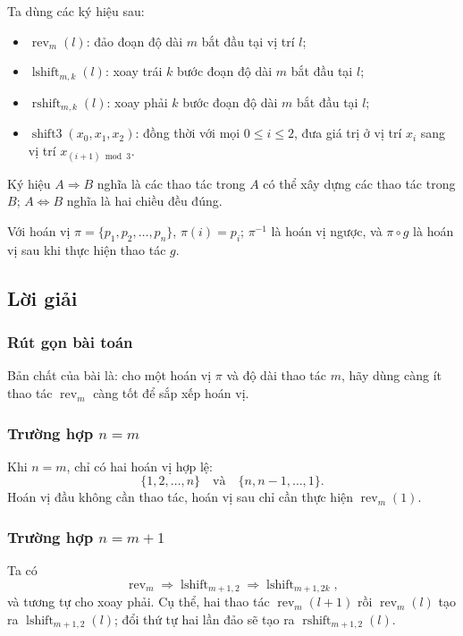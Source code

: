 \documentclass[11pt]{article}
\begin{document}
Ta dùng các ký hiệu sau:
\begin{itemize}
  \item $\operatorname{rev}_m(l)$: đảo đoạn độ dài $m$ bắt đầu tại vị trí $l$;
  \item $\operatorname{lshift}_{m,k}(l)$: xoay trái $k$ bước đoạn độ dài $m$ bắt
  đầu tại $l$;
  \item $\operatorname{rshift}_{m,k}(l)$: xoay phải $k$ bước đoạn độ dài $m$ bắt
  đầu tại $l$;
  \item $\operatorname{shift3}(x_0,x_1,x_2)$: đồng thời với mọi $0\le i\le 2$,
  đưa giá trị ở vị trí $x_i$ sang vị trí $x_{(i+1)\bmod 3}$.
\end{itemize}
Ký hiệu $A\Rightarrow B$ nghĩa là các thao tác trong $A$ có thể xây dựng các
thao tác trong $B$; $A\Leftrightarrow B$ nghĩa là hai chiều đều đúng.

Với hoán vị $\pi=\{p_1,p_2,\ldots,p_n\}$, $\pi(i)=p_i$; $\pi^{-1}$ là hoán vị
ngược, và $\pi\circ g$ là hoán vị sau khi thực hiện thao tác $g$.

\subsection{Lời giải}

\subsubsection{Rút gọn bài toán}

Bản chất của bài là: cho một hoán vị $\pi$ và độ dài thao tác $m$, hãy dùng càng
ít thao tác $\operatorname{rev}_m$ càng tốt để sắp xếp hoán vị.

\subsubsection{\texorpdfstring{Trường hợp \(n=m\)}{Trường hợp n=m}}

Khi $n=m$, chỉ có hai hoán vị hợp lệ:
\[
  \{1,2,\ldots,n\}\quad\text{và}\quad\{n,n-1,\ldots,1\}.
\]
Hoán vị đầu không cần thao tác, hoán vị sau chỉ cần thực hiện
$\operatorname{rev}_m(1)$.

\subsubsection{\texorpdfstring{Trường hợp \(n=m+1\)}{Trường hợp n=m+1}}

Ta có
\[
  \operatorname{rev}_m \Rightarrow
  \operatorname{lshift}_{m+1,2}\Rightarrow
  \operatorname{lshift}_{m+1,2k},
\]
và tương tự cho xoay phải. Cụ thể, hai thao tác
$\operatorname{rev}_m(l+1)$ rồi $\operatorname{rev}_m(l)$ tạo ra
$\operatorname{lshift}_{m+1,2}(l)$; đổi thứ tự hai lần đảo sẽ tạo ra
$\operatorname{rshift}_{m+1,2}(l)$.
\end{document}
